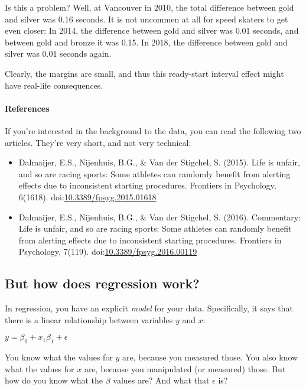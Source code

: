 \documentclass[11pt]{article}
\providecommand{\tightlist}{%
      \setlength{\itemsep}{0pt}\setlength{\parskip}{0pt}}
\begin{document}
    Is this a problem? Well, at Vancouver in 2010, the total difference
between gold and silver was 0.16 seconds. It is not uncommen at all for
speed skaters to get even closer: In 2014, the difference between gold
and silver was 0.01 seconds, and between gold and bronze it was 0.15. In
2018, the difference between gold and silver was 0.01 seconds again.

Clearly, the margins are small, and thus this ready-start interval
effect might have real-life consequences.

    \paragraph{References}\label{references}

If you're interested in the background to the data, you can read the
following two articles. They're very short, and not very technical:

\begin{itemize}
\tightlist
\item
  Dalmaijer, E.S., Nijenhuis, B.G., \& Van der Stigchel, S. (2015). Life
  is unfair, and so are racing sports: Some athletes can randomly
  benefit from alerting effects due to inconsistent starting procedures.
  Frontiers in Psychology, 6(1618).
  doi:\href{http://dx.doi.org/10.3389/fpsyg.2015.01618}{10.3389/fpsyg.2015.01618}
\item
  Dalmaijer, E.S., Nijenhuis, B.G., \& Van der Stigchel, S. (2016).
  Commentary: Life is unfair, and so are racing sports: Some athletes
  can randomly benefit from alerting effects due to inconsistent
  starting procedures. Frontiers in Psychology, 7(119).
  doi:\href{http://dx.doi.org/10.3389/fpsyg.2016.00119}{10.3389/fpsyg.2016.00119}
\end{itemize}

    \subsection{But how does regression
work?}\label{but-how-does-regression-work}

In regression, you have an explicit \emph{model} for your data.
Specifically, it says that there is a linear relationship between
variables \(y\) and \(x\):

\(y = \beta_{0} + x_{1} \beta_{1} + \epsilon\)

You know what the values for \(y\) are, because you measured those. You
also know what the values for \(x\) are, because you manipulated (or
measured) those. But how do you know what the \(\beta\) values are? And
what that \(\epsilon\) is?
\end{document}
